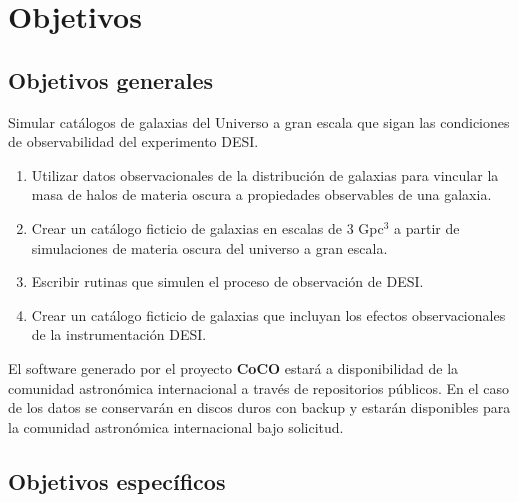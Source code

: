 \section{Objetivos}

\subsection{Objetivos generales} 

Simular cat\'alogos de galaxias del Universo a gran escala que sigan
las condiciones de observabilidad del experimento DESI.

\begin{enumerate}
\item  Utilizar datos observacionales de la distribuci\'on de galaxias
  para vincular la masa de halos de materia oscura a propiedades
  observables de una galaxia.
\item Crear un cat\'alogo ficticio de galaxias en escalas de $3$ Gpc$^3$
  a partir de simulaciones de materia oscura del universo a gran escala.
\item Escribir rutinas que simulen el proceso de observaci\'on de
  DESI.
\item Crear un cat\'alogo ficticio de galaxias que incluyan los
  efectos observacionales de la instrumentaci\'on DESI.
\end{enumerate}

El software generado por el proyecto {\bf CoCO} estar\'a a disponibilidad  de la comunidad astron\'omica internacional a trav\'es de repositorios p\'ublicos. En el caso de los datos se conservar\'an en discos duros con backup y estar\'an disponibles para la comunidad astron\'omica internacional bajo solicitud. 

\subsection{Objetivos espec\'ificos}


